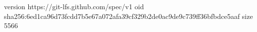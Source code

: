 version https://git-lfs.github.com/spec/v1
oid sha256:6ed1ca96d73fcdd7b5e67a072afa39cf329b2de0ac9de9c739ff36bfbdce5aaf
size 5566
